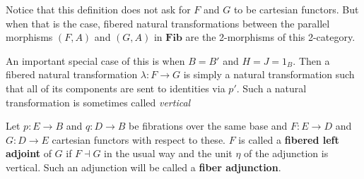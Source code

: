Notice that this definition does not ask for $F$ and $G$ to be cartesian functors. But when that is the case, fibered natural transformations between the parallel morphisms $(F, A)$ and $(G, A)$ in $\mathbf{Fib}$ are the 2-morphisms of this 2-category.

An important special case of this is when $B = B'$ and $H = J = 1_B$. Then a fibered natural transformation $\lambda : F \to G$ is simply a natural transformation such that all of its components are sent to identities via $p'$. Such a natural transformation is sometimes called \textit{vertical}

\begin{defn}Let $p : E \to B$ and $q : D \to B$ be fibrations over the same base and $F : E \to D$ and $G : D \to E$ cartesian functors with respect to these. $F$ is called a \textbf{fibered left adjoint} of $G$ if $F \dashv G$ in the usual way and the unit $\eta$ of the adjunction is vertical. Such an adjunction will be called a \textbf{fiber adjunction}.
\end{defn}

\begin{comment}
TODO: Put this in the right context (maybe leave it out actually)\\
Let $\mathcal{C}$ be a category and $F : \mathcal{C} \to \mathbf{Cat}$ a (pseudo)functor. $\textbf{Cat}_{/*}$ denotes the slice category of categories over the terminal category, i.e. the category constisting of pointed categories $(\mathcal{D}, d)$, $(\mathcal{E}, e)$ as objects and functors $G : \mathcal{D} \to \mathcal{E}$ equipped with morphisms $\gamma : G(d) \to e$ as morphisms.
\begin{defn}
The Grothendieck construction $\int F$ of $F$ is the pullback of the following diagram:
\[
\ti
\int F \ar[r] \ar[d] & \textbf{Cat}_{/*} \ar[d, "U"] \\
\mathcal{C} \ar[r, "F"] & \textbf{Cat} \\
\kz
\]
\end{defn}
In other words, the category whose objects consists of pairs $(a, b)$ where $a \in \Ob(\mathcal{C})$ and $b \in F(a)$, and whose morphisms $f : (a, b) \to (\alpha, \beta)$ are pairs $(f, g)$ where $f: a \to \alpha$ and $g : F(f)(b) \to \beta$.
\end{comment}
